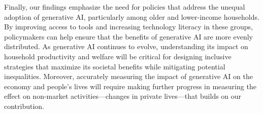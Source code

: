 \documentclass[12pt]{article}
\begin{document}
Finally, our findings emphasize the need for policies that address the unequal adoption of generative AI, particularly among older and lower-income households. By improving access to tools and increasing technology literacy in these groups, policymakers can help ensure that the benefits of generative AI are more evenly distributed. As generative AI continues to evolve, understanding its impact on household productivity and welfare will be critical for designing inclusive strategies that maximize its societal benefits while mitigating potential inequalities. Moreover, accurately measuring the impact of generative AI on the economy and people's lives will require making further progress in measuring the effect on non-market activities---changes in private lives---that builds on our contribution.




\clearpage
\newpage

{\small
\onehalfspacing 
  
  
}
\clearpage 














\clearpage

\end{document}
